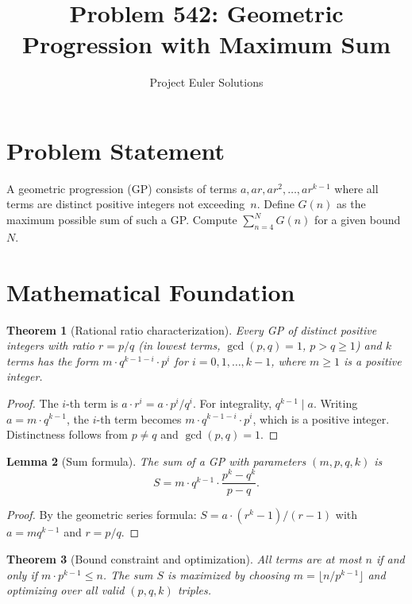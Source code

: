 \documentclass[11pt]{article}
\title{Problem 542: Geometric Progression with Maximum Sum}
\author{Project Euler Solutions}
\date{}
\newtheorem{theorem}{Theorem}
\newtheorem{lemma}[theorem]{Lemma}
\begin{document}
\maketitle

\section{Problem Statement}

A geometric progression (GP) consists of terms $a, ar, ar^2, \ldots, ar^{k-1}$ where all terms are distinct positive integers not exceeding~$n$. Define $G(n)$ as the maximum possible sum of such a GP. Compute $\sum_{n=4}^{N} G(n)$ for a given bound~$N$.

\section{Mathematical Foundation}

\begin{theorem}[Rational ratio characterization]
Every GP of distinct positive integers with ratio $r = p/q$ (in lowest terms, $\gcd(p,q)=1$, $p > q \ge 1$) and $k$ terms has the form $m \cdot q^{k-1-i} \cdot p^i$ for $i = 0, 1, \ldots, k-1$, where $m \ge 1$ is a positive integer.
\end{theorem}

\begin{proof}
The $i$-th term is $a \cdot r^i = a \cdot p^i / q^i$. For integrality, $q^{k-1} \mid a$. Writing $a = m \cdot q^{k-1}$, the $i$-th term becomes $m \cdot q^{k-1-i} \cdot p^i$, which is a positive integer. Distinctness follows from $p \neq q$ and $\gcd(p,q) = 1$.
\end{proof}

\begin{lemma}[Sum formula]
The sum of a GP with parameters $(m, p, q, k)$ is
\[
S = m \cdot q^{k-1} \cdot \frac{p^k - q^k}{p - q}.
\]
\end{lemma}

\begin{proof}
By the geometric series formula: $S = a \cdot (r^k - 1)/(r - 1)$ with $a = m q^{k-1}$ and $r = p/q$.
\end{proof}

\begin{theorem}[Bound constraint and optimization]
All terms are at most $n$ if and only if $m \cdot p^{k-1} \le n$. The sum $S$ is maximized by choosing $m = \lfloor n / p^{k-1} \rfloor$ and optimizing over all valid $(p, q, k)$ triples.
\end{theorem}
\end{document}

